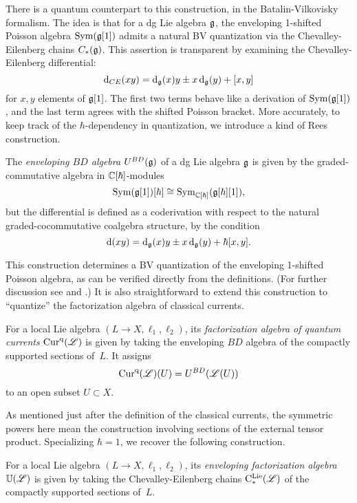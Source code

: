 There is a quantum counterpart to this construction, in the Batalin-Vilkovisky formalism.
The idea is that for a dg Lie algebra $\mathfrak g$, 
the enveloping 1-shifted Poisson algebra ${\rm Sym}(\mathfrak g[1])$ admits a natural BV quantization via the Chevalley-Eilenberg chains $C_*(\mathfrak g)$.  
This assertion is transparent by examining the Chevalley-Eilenberg differential:
\[
{\rm d}_{CE}(xy) = {\rm d}_\mathfrak g(x)y \pm x\, {\rm d}_\mathfrak g(y) + [x,y]
\]
for $x,y$ elements of $\mathfrak g[1]$.
The first two terms behave like a derivation of ${\rm Sym}(\mathfrak g[1])$, 
and the last term agrees with the shifted Poisson bracket.
More accurately, to keep track of the $\hbar$-dependency in quantization,
we introduce a kind of Rees construction.

\begin{dfn}
\label{def: BD envelope}
The {\em enveloping $BD$ algebra} $U^{BD}(\mathfrak g)$ of a dg Lie algebra $\mathfrak g$ is given by the graded-commutative algebra in $\mathbb C[\hbar]$-modules
\[
{\rm Sym}(\mathfrak g[1])[\hbar] \cong {\rm Sym}_{\mathbb C[\hbar]}(\mathfrak g[\hbar][1]),
\]
but the differential is defined as a coderivation with respect to the natural graded-cocommutative coalgebra structure,
by the condition
\[
{\rm d}(xy) = {\rm d}_\mathfrak g(x)y \pm x\, {\rm d}_\mathfrak g(y) + \hbar [x,y].
\]
\end{dfn}

This construction determines a BV quantization of the enveloping 1-shifted Poisson algebra,
as can be verified directly from the definitions.
(For further discussion see \cite{GH} and \cite{CG2}.)
It is also straightforward to extend this construction to ``quantize'' the factorization algebra of classical currents.

\begin{dfn}
\label{dfn: quantum currents}
For a local Lie algebra $(L\to X, \ell_1,\ell_2)$, 
its {\em factorization algebra of quantum currents} ${\rm Cur}^{\rm q}(\mathscr L)$ is given by taking the enveloping $BD$   algebra of the compactly supported sections of~$L$.
It assigns
\[
{\rm Cur}^{\rm q}(\mathscr L)(U) = U^{BD}(\mathscr L(U))
\]
to an open subset $U \subset X$.
\end{dfn}

As mentioned just after the definition of the classical currents, 
the symmetric powers here mean the construction involving sections of the external tensor product.
Specializing $\hbar = 1$, we recover the following construction.

\begin{dfn}
For a local Lie algebra $(L\to X, \ell_1,\ell_2)$, 
its {\em enveloping factorization algebra} $\mathbb U(\mathscr L)$ is given by taking the Chevalley-Eilenberg chains ${\rm C}^{\rm Lie}_*(\mathscr L)$ of the compactly supported sections of~$L$.
\end{dfn}

